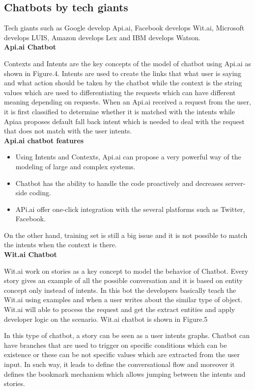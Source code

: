 \documentclass[conference]{IEEEtran}
\begin{document}
\subsection{Chatbots by tech giants}
Tech giants such as Google develop Api.ai, Facebook develops Wit.ai, Microsoft develops LUIS, Amazon develops Lex and IBM develops Watson.\\

\textbf{Api.ai Chatbot}

Contexts and Intents are the key concepts of the model of chatbot using Api.ai as shown in Figure.4. Intents are used to create the links that what user is saying and what action should be taken by the chatbot while the context is the string values which are used to differentiating the requests which can have different meaning depending on requests. When an Api.ai received a request from the user, it is first classified to determine whether it is matched with the intents while Apiaa proposes default fall back intent which is needed to deal with the request that does not match with the user intents.\\


\textbf{Api.ai chatbot features}
\begin{itemize}
\item Using Intents and Contexts, Api.ai can propose a very powerful way of the modeling of large and complex systems.
\item Chatbot has the ability to handle the code proactively and decreases server-side coding.
\item APi.ai offer one-click integration with the several platforms such as Twitter, Facebook.\\
\end{itemize}
On the other hand, training set is still a big issue and it is not possible to match the intents when the context is there.\\

\textbf{Wit.ai Chatbot}

Wit.ai work on stories as a key concept to model the behavior of Chatbot. Every story gives an example of all the possible conversation and it is based on entity concept only instead of intents. In this bot the developers basically teach the Wit.ai using examples and when a user writes about the similar type of object. Wit.ai will able to process the request and get the extract entities and apply developer logic on the scenario. Wit.ai chatbot is shown in Figure.5


In this type of chatbot, a story can be seen as a user intents graphs. Chatbot can have branches that are used to trigger on specific conditions which can be existence or these can be not specific values which are extracted from the user input. In such way, it leads to define the conversational flow and moreover it defines the bookmark mechanism which allows jumping between the intents and stories.
\end{document}
